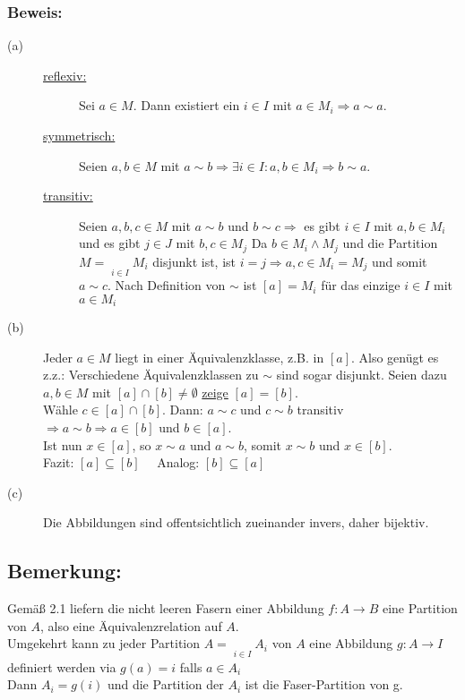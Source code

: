 \subsubsection{Beweis:}
\begin{description}
	\item[(a)] \quad
	\begin{description}
		\item[\underline{reflexiv:}] Sei $a \in M$. Dann existiert ein $i \in I$ mit $a \in M_{i} \Rightarrow a \sim a$.
		\item[\underline{symmetrisch:}] Seien $a,b \in M$ mit $a \sim b \Rightarrow \exists i \in I: a,b \in M_{i} \Rightarrow b \sim a$.
		\item[\underline{transitiv:}] Seien $a,b,c \in M$ mit $a \sim b$ und $b \sim c \Rightarrow$ es gibt $i \in I$ mit 
			$a,b \in M_{i}$ und es gibt $j\in J$ mit $b,c \in M_{j}$ Da $b \in M_{i} \wedge M_{j}$ und die Partition $M 
			= \mathop{\dot{\bigcup}}\limits_{i \in I} M_{i}$ disjunkt ist, ist $i = j \Rightarrow a,c \in M_{i} = M_{j}$ und somit $a \sim 
			c$. Nach Definition von $\sim$ ist $[a] = M_{i}$ für das einzige $i \in I$ mit $a \in M_{i}$
	\end{description}
	\item[(b)] Jeder $a \in M$ liegt in einer Äquivalenzklasse, z.B. in $[a]$. Also genügt es z.z.: Verschiedene 	
		Äquivalenzklassen zu $\sim$ sind sogar disjunkt. Seien dazu $a,b \in M$ mit $[a] \cap [b] \neq \emptyset$ 
		\underline{zeige} $[a] = [b]$. \\
		Wähle $c \in [a] \cap [b]$. Dann: $a \sim c$ und $c \sim b$ transitiv $\Rightarrow a \sim b \Rightarrow a \in [b]$ 
		und $b \in [a]$. \\
		Ist nun $x \in [a]$, so $x \sim a$ und $a \sim b$, somit $x \sim b$ und $x \in [b]$. \\ 
		Fazit: $[a] \subseteq [b]$ \ \ Analog: $[b] \subseteq [a]$
	\item[(c)] Die Abbildungen sind offentsichtlich zueinander invers, daher bijektiv.
\end{description}
%
%
%
\subsection{Bemerkung:}
Gemäß 2.1 liefern die nicht leeren Fasern einer Abbildung $f: A \rightarrow B$ eine Partition von $A$, also eine Äquivalenzrelation auf $A$.\\
Umgekehrt kann zu jeder Partition $A =  \mathop{\dot{\bigcup}}\limits_{i \in I} A_{i}$ von $A$ eine Abbildung $g: A \rightarrow I$ definiert werden via $g(a) = i$ falls $a \in A_{i}$\\
Dann $A_{i} = g(i)$ und die Partition der $A_{i}$ ist die Faser-Partition von g.